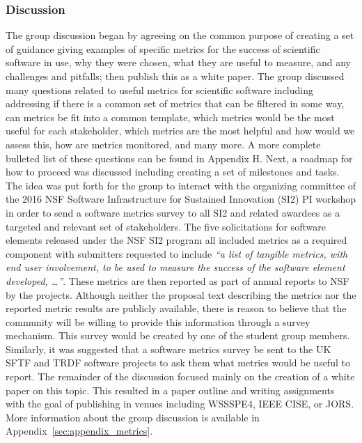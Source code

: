 \subsubsection{Discussion}

The group discussion began by agreeing on the common purpose of creating a set
of guidance giving examples of specific metrics for the success of scientific
software in use, why they were chosen, what they are useful to measure, and any
challenges and pitfalls; then publish this as a white paper. The group discussed
many questions related to useful metrics for scientific software including
addressing if there is a common set of metrics that can be filtered in some way,
can metrics be fit into a common template, which metrics would be the most
useful for each stakeholder, which metrics are the most helpful and how would we
assess this, how are metrics monitored, and many more. A more complete bulleted
list of these questions can be found in Appendix H. Next, a roadmap for how to
proceed was discussed including creating a set of milestones and tasks. The idea
was put forth for the group to interact with the organizing committee of the
2016 NSF Software Infrastructure for Sustained Innovation (SI2) PI workshop in
order to send a software metrics survey to all SI2 and related awardees as a
targeted and relevant set of stakeholders. The five solicitations for software
elements released under the NSF SI2 program all included metrics as a required
component with submitters requested to include {\it ``a list of tangible metrics,
with end user involvement, to be used to measure the success of the software
element developed, \dots''}. These metrics are then reported as part of annual
reports to NSF by the projects. Although neither the proposal text describing
the metrics nor the reported metric results are publicly available, there is
reason to believe that the community will be willing to provide this information
through a survey mechanism. This survey would be created by one of the student
group members. Similarly, it was suggested that a software metrics survey be
sent to the UK SFTF and TRDF software projects to ask them what metrics would be
useful to report. The remainder of the discussion focused mainly on the creation
of a white paper on this topic. This resulted in a paper outline and writing
assignments with the goal of publishing in venues including WSSSPE4, IEEE CISE,
or JORS. More information about the group discussion is available in
Appendix~\ref{sec:appendix_metrics}. 

